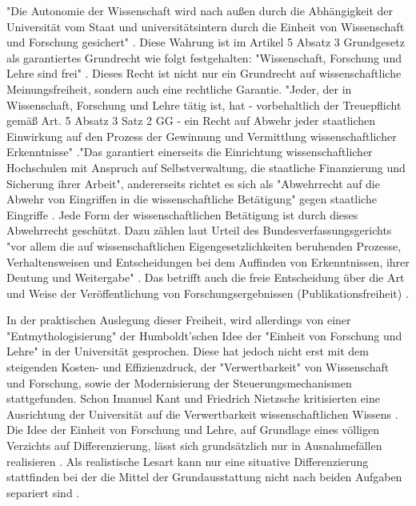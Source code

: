 "Die Autonomie der Wissenschaft wird nach außen durch die Abhängigkeit der Universität vom Staat und universitätsintern durch die Einheit von Wissenschaft und Forschung gesichert" \cite{Huber_2005}. Diese Wahrung ist im Artikel 5 Absatz 3 Grundgesetz als garantiertes Grundrecht wie folgt festgehalten: "Wissenschaft, Forschung und Lehre sind frei" \cite{suchen_GG}. Dieses Recht ist nicht nur ein Grundrecht auf wissenschaftliche Meinungsfreiheit, sondern auch eine rechtliche Garantie. "Jeder, der in Wissenschaft, Forschung und Lehre tätig ist, hat - vorbehaltlich der Treuepflicht gemäß Art. 5 Absatz 3 Satz 2 GG - ein Recht auf Abwehr jeder staatlichen Einwirkung auf den Prozess der Gewinnung und Vermittlung wissenschaftlicher Erkenntnisse" \cite{suchen_BVG}."Das garantiert einerseits die Einrichtung wissenschaftlicher Hochschulen mit Anspruch auf Selbstverwaltung, die staatliche Finanzierung und Sicherung ihrer Arbeit"\cite{suchen_BVG}, andererseits richtet es sich als "Abwehrrecht auf die Abwehr von Eingriffen in die wissenschaftliche Betätigung" gegen staatliche Eingriffe \cite{mayen_grundrechte_forscher} \cite{spindler_2006_rechtloa}. Jede Form der wissenschaftlichen Betätigung ist durch dieses Abwehrrecht geschützt. Dazu zählen laut Urteil des Bundesverfassungsgerichts "vor allem die auf wissenschaftlichen Eigengesetzlichkeiten beruhenden Prozesse, Verhaltensweisen und Entscheidungen bei dem Auffinden von Erkenntnissen, ihrer Deutung und Weitergabe" \cite{suchen}. Das betrifft auch die freie Entscheidung über die Art und Weise der Veröffentlichung von Forschungsergebnissen (Publikationsfreiheit) \cite{Fangerau_2014}.

In der praktischen Auslegung dieser Freiheit, wird allerdings von einer "Entmythologisierung" der Humboldt’schen Idee der "Einheit von Forschung und Lehre" in der Universität gesprochen. Diese hat jedoch nicht erst mit dem steigenden Kosten- und Effizienzdruck, der "Verwertbarkeit" von Wissenschaft und Forschung, sowie der Modernisierung der Steuerungsmechanismen stattgefunden. Schon Imanuel Kant und Friedrich Nietzsche kritisierten eine Ausrichtung der Universität auf die Verwertbarkeit wissenschaftlichen Wissens \cite{Huber_2005}. Die Idee der Einheit von Forschung und Lehre, auf Grundlage eines völligen Verzichts auf Differenzierung, lässt sich grundsätzlich nur in Ausnahmefällen realisieren \cite{Schimank_2001}. Als realistische Lesart kann nur eine situative Differenzierung stattfinden bei der die Mittel der Grundausstattung nicht nach beiden Aufgaben separiert sind \cite{Schimank_2001}.

